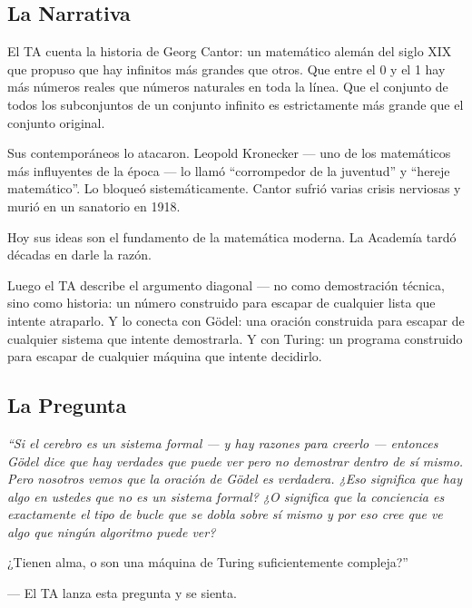 \documentclass[11pt, letterpaper]{article}
\begin{document}
\subsection*{La Narrativa}

El TA cuenta la historia de Georg Cantor: un matem\'atico alem\'an del siglo XIX que propuso que hay infinitos m\'as grandes que otros. Que entre el 0 y el 1 hay m\'as n\'umeros reales que n\'umeros naturales en toda la l\'inea. Que el conjunto de todos los subconjuntos de un conjunto infinito es estrictamente m\'as grande que el conjunto original.

Sus contempor\'aneos lo atacaron. Leopold Kronecker --- uno de los matem\'aticos m\'as influyentes de la \'epoca --- lo llam\'o ``corrompedor de la juventud'' y ``hereje matem\'atico''. Lo bloque\'o sistem\'aticamente. Cantor sufri\'o varias crisis nerviosas y muri\'o en un sanatorio en 1918.

Hoy sus ideas son el fundamento de la matem\'atica moderna. La Academ\'ia tard\'o d\'ecadas en darle la raz\'on.

Luego el TA describe el argumento diagonal --- no como demostraci\'on t\'ecnica, sino como historia: un n\'umero construido para escapar de cualquier lista que intente atraparlo. Y lo conecta con G\"odel: una oraci\'on construida para escapar de cualquier sistema que intente demostrarla. Y con Turing: un programa construido para escapar de cualquier m\'aquina que intente decidirlo.

\subsection*{La Pregunta}

\begin{tcolorbox}[colback=outdoorgreen!5, colframe=outdoorgreen, boxrule=0.7pt,
  left=8pt, right=8pt, top=6pt, bottom=6pt]
{\itshape ``Si el cerebro es un sistema formal --- y hay razones para creerlo --- entonces G\"odel dice que hay verdades que puede ver pero no demostrar dentro de s\'i mismo. Pero nosotros \emph{vemos} que la oraci\'on de G\"odel es verdadera. ¿Eso significa que hay algo en ustedes que no es un sistema formal? ¿O significa que la conciencia \emph{es} exactamente el tipo de bucle que se dobla sobre s\'i mismo y por eso cree que ve algo que ning\'un algoritmo puede ver?

\medskip
¿Tienen alma, o son una m\'aquina de Turing suficientemente compleja?''}

\medskip
\hfill --- El TA lanza esta pregunta y se sienta.
\end{tcolorbox}
\end{document}
